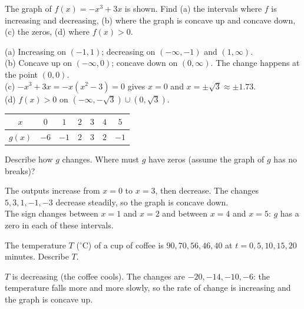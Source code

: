 \begin{center}
\end{center}
The graph of $f(x)=-x^3+3x$ is shown. Find (a) the intervals where $f$ is increasing and decreasing, (b) where the graph is concave up and concave down, (c) the zeros, (d) where $f(x)>0$.
\begin{workspace}[4.2cm]
(a) Increasing on $(-1,1)$; decreasing on $(-\infty,-1)$ and $(1,\infty)$.\\
(b) Concave up on $(-\infty,0)$; concave down on $(0,\infty)$. The change happens at the point $(0,0)$.\\
(c) $-x^3+3x=-x(x^2-3)=0$ gives $x=0$ and $x=\pm\sqrt3\approx\pm1.73$.\\
(d) $f(x)>0$ on $(-\infty,-\sqrt3)\cup(0,\sqrt3)$.
\end{workspace}

\begin{center}\begin{tabular}{c|cccccc}$x$&$0$&$1$&$2$&$3$&$4$&$5$\\\hline$g(x)$&$-6$&$-1$&$2$&$3$&$2$&$-1$\end{tabular}\end{center}
Describe how $g$ changes. Where must $g$ have zeros (assume the graph of $g$ has no breaks)?
\begin{workspace}[3.6cm]
The outputs increase from $x=0$ to $x=3$, then decrease. The changes $5,3,1,-1,-3$ decrease steadily, so the graph is concave down.\\
The sign changes between $x=1$ and $x=2$ and between $x=4$ and $x=5$: $g$ has a zero in each of these intervals.
\end{workspace}

The temperature $T$ ($^\circ$C) of a cup of coffee is $90, 70, 56, 46, 40$ at $t=0,5,10,15,20$ minutes. Describe $T$.
\begin{workspace}[2.8cm]
$T$ is decreasing (the coffee cools). The changes are $-20,-14,-10,-6$: the temperature falls more and more slowly, so the rate of change is increasing and the graph is concave up.
\end{workspace}

